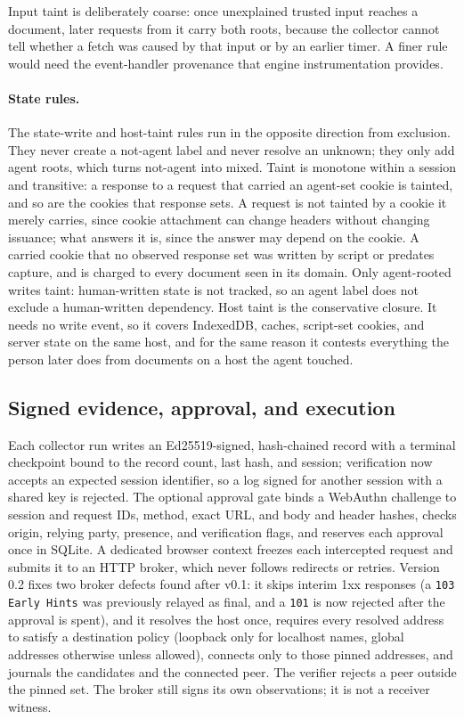 \documentclass[11pt]{article}
\theoremstyle{definition}
\begin{document}
Input taint is deliberately coarse: once unexplained trusted input reaches a
document, later requests from it carry both roots, because the collector cannot
tell whether a fetch was caused by that input or by an earlier timer. A finer rule
would need the event-handler provenance that engine instrumentation provides.

\paragraph{State rules.} The state-write and host-taint rules run in the opposite
direction from exclusion. They never create a not-agent label and never resolve
an unknown; they only add agent roots, which turns not-agent into mixed. Taint is
monotone within a session and transitive: a response to a request that carried an
agent-set cookie is tainted, and so are the cookies that response sets. A request
is not tainted by a cookie it merely carries, since cookie attachment can change headers
without changing issuance; what answers it is, since the answer may depend
on the cookie. A carried cookie that no observed response set was written by
script or predates capture, and is charged to every document seen in its domain.
Only agent-rooted writes taint: human-written state is not tracked, so an agent
label does not exclude a human-written dependency. Host taint is the conservative
closure. It needs no write event, so it covers IndexedDB, caches, script-set
cookies, and server state on the same host, and for the same reason it contests
everything the person later does from documents on a host the agent touched.

\subsection{Signed evidence, approval, and execution}
Each collector run writes an Ed25519-signed, hash-chained record with a terminal
checkpoint bound to the record count, last hash, and session; verification now
accepts an expected session identifier, so a log signed for another session with
a shared key is rejected. The optional approval gate binds a WebAuthn
\cite{webauthn} challenge to session and request IDs, method, exact URL, and body
and header hashes, checks origin, relying party, presence, and verification
flags, and reserves each approval once in SQLite. A dedicated browser context
freezes each intercepted request and submits it to an HTTP broker, which never
follows redirects or retries. Version 0.2 fixes two broker defects found after
v0.1: it skips interim 1xx responses (a \texttt{103 Early Hints} was previously
relayed as final, and a \texttt{101} is now rejected after the approval is spent),
and it resolves the host once, requires every resolved address to satisfy a
destination policy (loopback only for localhost names, global addresses otherwise
unless allowed), connects only to those pinned addresses, and journals the
candidates and the connected peer. The verifier rejects a peer outside the pinned
set. The broker still signs its own observations; it is not a receiver witness.
\end{document}
